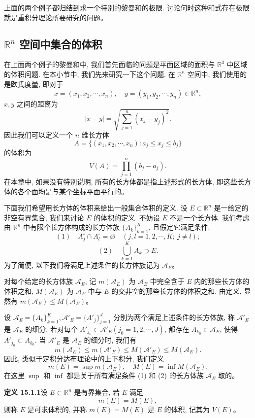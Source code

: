 \documentclass[UTF8, 12pt, fontset=fandol, oneside]{ctexart}
\begin{document}
上面的两个例子都归结到求一个特别的黎曼和的极限. 讨论何时这种和式存在极限就是重积分理论所要研究的问题。

\subsection{$\mathbb R^n$ 空间中集合的体积}

在上面两个例子的黎曼和中, 我们首先面临的问题是平面区域的面积与 $\mathbb R^3$ 中区域的体积问题. 在本小节中, 我们先来研究一下这个问题. 在 $\mathbb R^n$ 空间中, 我们使用的是欧氏度量, 即对于
\[
  x=(x_1,x_2,\cdots,x_n),\quad y=(y_1,y_2,\cdots,y_n)\in\mathbb R^n,
\]
$x,y$ 之间的距离为
\[
  |x-y|=\sqrt{\sum_{j=1}^n(x_j-y_j)^2}.
\]
因此我们可以定义一个 $n$ 维长方体
\[
  A=\{(x_1,x_2,\cdots,x_n):a_j\leqslant x_j\leqslant b_j\}
\]
的体积为
\[
  V(A)=\prod_{j=1}^n(b_j-a_j).
\]
在本章中, 如果没有特别说明, 所有的长方体都是指上述形式的长方体, 即这些长方体的各个面均是与某个坐标平面平行的。

下面我们希望用长方体的体积来给出一般集合体积的定义. 设 $E\subset\mathbb R^n$ 是一给定的非空有界集合, 我们来讨论 $E$ 的体积的定义. 不妨设 $E$ 不是一个长方体. 我们考虑由 $\mathbb R^n$ 中有限个长方体构成的长方体族 $\{A_k\}_{k=1}^K$, 且假定它满足条件:
\[
  (1)\quad A_j^\circ\cap A_l^\circ=\varnothing\quad (j,l=1,2,\cdots,K;\ j\ne l);
\]
\[
  (2)\quad \bigcup_{k=1}^K A_k\supset E.
\]
为了简便, 以下我们将满足上述条件的长方体族记为 $\mathcal A_E$。

对每个给定的长方体族 $\mathcal A_E$, 记 $m(\mathcal A_E)$ 为 $\mathcal A_E$ 中完全含于 $E$ 内的那些长方体的体积之和, $M(\mathcal A_E)$ 为 $\mathcal A_E$ 中与 $E$ 的交非空的那些长方体的体积之和. 由定义, 显然有 $m(\mathcal A_E)\leqslant M(\mathcal A_E)$。

设 $\mathcal A_E=\{A_k\}_{k=1}^K,\mathcal A'_E=\{A'_j\}_{j=1}^J$ 分别为两个满足上述条件的长方体族, 称 $\mathcal A'_E$ 是 $\mathcal A_E$ 的细分, 若对每个 $A'_{j_0}\in\mathcal A'_E(j_0=1,2,\cdots,J)$, 都存在 $A_{k_0}\in\mathcal A_E$, 使得 $A'_{j_0}\subset A_{k_0}$. 当 $\mathcal A'_E$ 是 $\mathcal A_E$ 的细分时, 我们有
\[
  m(\mathcal A_E)\leqslant m(\mathcal A'_E)\leqslant M(\mathcal A'_E)\leqslant M(\mathcal A_E).
\]
因此, 类似于定积分达布理论中的上下积分, 我们定义
\[
  m(E)=\sup m(\mathcal A_E),\quad M(E)=\inf M(\mathcal A_E).
\]
在这里 $\sup$ 和 $\inf$ 都是关于所有满足条件 (1) 和 (2) 的长方体族 $\mathcal A_E$ 取的。

\noindent\textbf{定义 15.1.1}\quad 设 $E\subset\mathbb R^n$ 是有界集合, 若 $E$ 满足
\[
  m(E)=M(E),
\]
则称 $E$ 是可求体积的, 并称 $m(E)=M(E)$ 是 $E$ 的体积, 记其为 $V(E)$。
\end{document}
